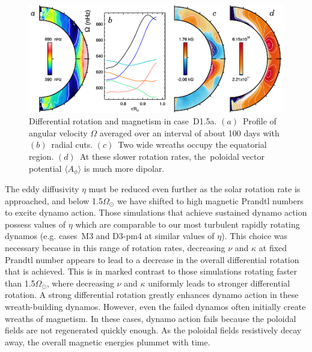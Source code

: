 \begin{figure}[!t]
  \begin{center}
    \includegraphics{figs/chapter_8/case_D1.5a_mean_flows.eps}
  \end{center}
  \caption[Differential rotation and magnetism in case~D1.5a]
          {Differential rotation and magnetism in case~D1.5a.
          $(a)$~Profile of angular velocity $\Omega$ averaged over an
          interval of about 100 days with $(b)$~radial
          cuts.  $(c)$~Two wide wreaths occupy the
          equatorial region. $(d)$~At these slower rotation rates, the~poloidal
          vector potential $\langle A_\phi \rangle$ is much more dipolar.
  \label{fig:D1.5a mean flows}}
\end{figure}

The eddy diffusivity $\eta$ must be reduced even further as the solar
rotation rate is approached, and below 1.5\thinspace$\Omega_\odot$ we
have shifted to high magnetic Prandtl numbers to excite dynamo action.
Those simulations that achieve sustained dynamo action possess  values
of $\eta$ which are comparable to our most turbulent rapidly rotating
dynamos (e.g. cases~M3 and D3-pm4 at similar values of $\eta$).
This choice was necessary because in this range of rotation rates,
decreasing $\nu$ and $\kappa$ at fixed Prandtl number  
appears to lead to a decrease in the overall differential rotation
that is achieved.  This is in marked contrast to those simulations
rotating faster than 1.5\thinspace$\Omega_\odot$, where decreasing
$\nu$ and $\kappa$ uniformly leads to stronger differential rotation.
A strong differential rotation greatly enhances dynamo action in these
wreath-building dynamos.  However, even the failed dynamos often
initially create wreaths of magnetism.  In these cases, dynamo action
fails because the poloidal fields are not regenerated quickly enough.
As the poloidal fields resistively decay away, the overall magnetic
energies plummet with time.



